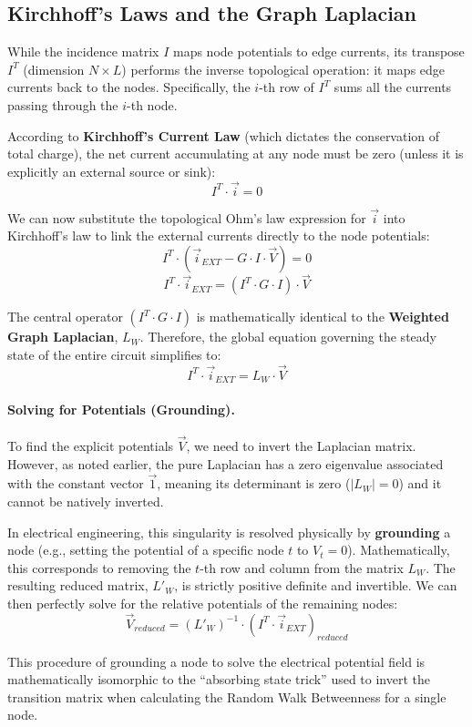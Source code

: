 \subsection{Kirchhoff's Laws and the Graph Laplacian}

While the incidence matrix $I$ maps node potentials to edge currents, its transpose $I^T$ (dimension $N \times L$) performs the inverse topological operation: it maps edge currents back to the nodes. Specifically, the $i$-th row of $I^T$ sums all the currents passing through the $i$-th node.

According to \textbf{Kirchhoff's Current Law} (which dictates the conservation of total charge), the net current accumulating at any node must be zero (unless it is explicitly an external source or sink):
\[
    I^T \cdot \vec{i} = 0
\]

We can now substitute the topological Ohm's law expression for $\vec{i}$ into Kirchhoff's law to link the external currents directly to the node potentials:
\[
    I^T \cdot (\vec{i}_{EXT} - G \cdot I \cdot \vec{V}) = 0
\]
\[
    I^T \cdot \vec{i}_{EXT} = (I^T \cdot G \cdot I) \cdot \vec{V}
\]

The central operator $(I^T \cdot G \cdot I)$ is mathematically identical to the \textbf{Weighted Graph Laplacian}, $L_W$. Therefore, the global equation governing the steady state of the entire circuit simplifies to:
\[
    I^T \cdot \vec{i}_{EXT} = L_W \cdot \vec{V}
\]

\paragraph{Solving for Potentials (Grounding).}
To find the explicit potentials $\vec{V}$, we need to invert the Laplacian matrix. However, as noted earlier, the pure Laplacian has a zero eigenvalue associated with the constant vector $\vec{1}$, meaning its determinant is zero ($|L_W| = 0$) and it cannot be natively inverted.

In electrical engineering, this singularity is resolved physically by \textbf{grounding} a node (e.g., setting the potential of a specific node $t$ to $V_t = 0$). Mathematically, this corresponds to removing the $t$-th row and column from the matrix $L_W$. The resulting reduced matrix, $L'_W$, is strictly positive definite and invertible. We can then perfectly solve for the relative potentials of the remaining nodes:
\[
    \vec{V}_{reduced} = (L'_W)^{-1} \cdot (I^T \cdot \vec{i}_{EXT})_{reduced}
\]

This procedure of grounding a node to solve the electrical potential field is mathematically isomorphic to the ``absorbing state trick'' used to invert the transition matrix when calculating the Random Walk Betweenness for a single node.

